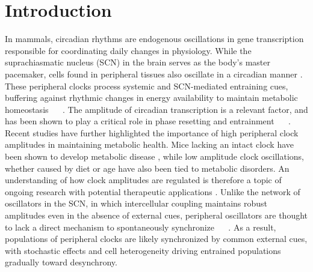 \documentclass[11pt, letterpaper]{article}
\providecommand{\DIFadd}[1]{{\protect\color{blue}#1}} %
\providecommand{\DIFdel}[1]{{\protect\color{red}}}                      %
\providecommand{\DIFaddbegin}{} %
\providecommand{\DIFaddend}{} %
\providecommand{\DIFdelbegin}{} %
\providecommand{\DIFdelend}{} %
\begin{document}
\section*{Introduction}
In mammals, circadian rhythms are endogenous oscillations in gene transcription responsible for coordinating daily changes in physiology.
While the suprachiasmatic nucleus (SCN) in the brain serves as the body's master pacemaker, cells found in peripheral tissues also oscillate in a circadian manner \cite{Lamia2008}.
These peripheral clocks process systemic and SCN-mediated entraining cues, buffering against rhythmic changes in energy availability to maintain metabolic homeostasis \DIFdelbegin \DIFdel{\mbox{%
\cite{Kornmann2007,
Green2008a}
}%
.
The }\DIFdelend \DIFaddbegin \DIFadd{\mbox{%
\cite{Kornmann2007}
}%
.
The amplitude of circadian transcription is a relevant factor, and has been shown to play a critical role in phase resetting and entrainment \mbox{%
\cite{Pittendrigh1991, Abraham2010}
}%
.
Recent studies have further highlighted the }\DIFaddend importance of high peripheral clock amplitudes in maintaining \DIFdelbegin \DIFdel{health is becoming increasingly apparent: mice }\DIFdelend \DIFaddbegin \DIFadd{metabolic health.
Mice }\DIFaddend lacking an intact clock have been shown to develop metabolic disease \cite{Marcheva2010}, while low amplitude clock oscillations, whether caused by diet \cite{Hatori2012} or age \cite{Chang2013} have also been tied to metabolic disorders.
An understanding of how clock amplitudes are regulated is therefore a topic of ongoing research with potential therapeutic applications \cite{St.John2014}.
 Unlike the network of oscillators in the SCN, in which intercellular coupling maintains robust amplitudes even in the absence of external cues, peripheral oscillators are thought to lack a direct mechanism to spontaneously synchronize \DIFdelbegin \DIFdel{\mbox{%
\cite{Welsh2004, Liu2007}
}%
}\DIFdelend \DIFaddbegin \DIFadd{\mbox{%
\cite{Welsh2004}
}%
}\DIFaddend .
As a result, populations of peripheral clocks are likely synchronized by common external cues, with stochastic effects and cell heterogeneity driving entrained populations \DIFdelbegin \DIFdel{to gradually desynchronize}\DIFdelend \DIFaddbegin \DIFadd{gradually toward desynchrony}\DIFaddend .
\end{document}
